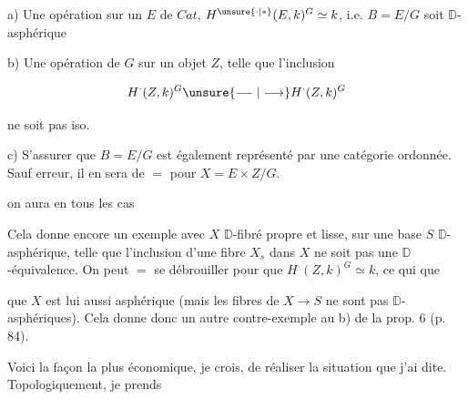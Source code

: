 a) Une opération  sur un  $E$ de $\mathit{Cat}$,    $H^{\unsure{\cdot|*}}(E,k)^G\simeq k$, i.e. $B=E/G$ soit $\mathbb D$-asphérique

b) Une opération de $G$ sur un objet $Z$, telle que l'inclusion

\[
H^{\cdot}(Z,k)^G\unsure{\relbar\joinrel\relbar|\longrightarrow}H^{\cdot}(Z,k)^G
\]

ne soit pas iso.

c)  S'assurer que $B=E/G$ est également représenté par une catégorie ordonnée. Sauf erreur, il en sera de $=$ pour $X=E\times Z/G$.

 on aura en tous les cas


Cela donne encore un exemple avec $X$ $\mathbb D$-fibré propre et lisse, sur une base $S$ $\mathbb D$-asphérique, telle que l'inclusion d'une fibre $X_s$ dans $X$ ne soit pas une $\mathbb D$-équivalence. On peut $=$ se débrouiller pour que $H^{\cdot}(Z,k)^G\simeq k$, ce qui  que


que $X$ est lui aussi asphérique (mais les fibres de $X\to S$ ne sont pas $\mathbb D$-asphériques). Cela donne donc un autre contre-exemple au b) de la prop. 6 (p. 84).

Voici la façon la plus économique, je crois, de réaliser la situation que j'ai dite. Topologiquement, je prends 

